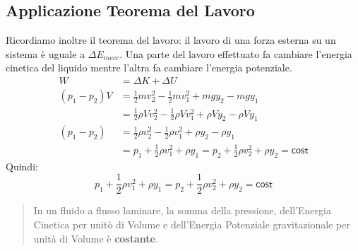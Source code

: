         \subsection{Applicazione Teorema del Lavoro}
        Ricordiamo inoltre il teorema del lavoro: il lavoro di una forza 
        esterna su un sistema è uguale a $\Delta E_{mecc}$. Una parte del 
        lavoro effettuato fa cambiare l'energia cinetica del liquido mentre 
        l'altra fa cambiare l'energia potenziale.
            \begin{align*}
                W &= \Delta K + \Delta U \\
                (p_1 - p_2)V &= \frac{1}{2}mv^2_2 - \frac{1}{2}mv^2_1 
                                + mgy_2 - mgy_1 \\
                &= \frac{1}{2}\rho Vv^2_2 - \frac{1}{2}\rho Vv^2_1 
                                + \rho Vy_2 - \rho Vy_1 \\
                (p_1 - p_2) &= \frac{1}{2}\rho v^2_2 
                                - \frac{1}{2}\rho v^2_1 
                                + \rho y_2 - \rho y_1 \\
                &= p_1 + \frac{1}{2}\rho v^2_1 + \rho y_1 =
                    p_2 + \frac{1}{2}\rho v^2_2 + \rho y_2 = \textsf{cost}
            \end{align*}
        Quindi:
            \begin{equation}
                p_1 + \frac{1}{2}\rho v^2_1 + \rho y_1 
                =
                p_2 + \frac{1}{2}\rho v^2_2 + \rho y_2 
                = 
                \textsf{cost}
            \end{equation}
            \begin{quote}
                In un fluido a flusso laminare, la somma della pressione, 
                dell'Energia Cinetica per unitò di Volume e dell'Energia 
                Potenziale gravitazionale per unità di Volume è 
                \textbf{costante}.
            \end{quote}

